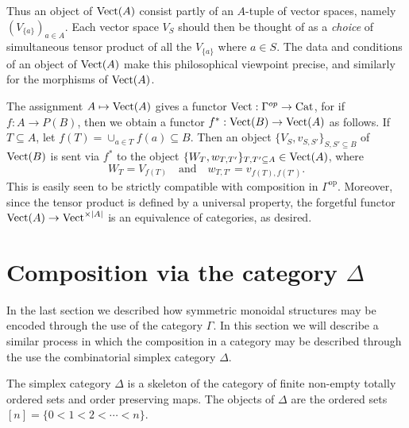 \documentclass{amsart}
\begin{document}
Thus an object of $\mathrm{Vect}(A)$ consist partly of an $A$-tuple of vector spaces, namely $ (V_{\{a\}})_{a \in A}$. Each vector space $V_S$ should then be thought of as a {\em choice} of simultaneous tensor product of all the $V_{\{a\}}$ where $a \in S$. The data and conditions of an object of $\mathrm{Vect}(A)$ make this philosophical viewpoint precise, and similarly for the morphisms of $\mathrm{Vect}(A)$. 

The assignment $A \mapsto \mathrm{Vect}(A)$ gives a functor $\mathrm{Vect}: \Gamma^{op} \to \mathrm{Cat}$, for if $f: A \to P(B)$, then we obtain a functor $f^*: \mathrm{Vect}(B) \to \mathrm{Vect}(A)$ as follows. If $T \subseteq A$, let $f(T) = \cup_{a \in T} f(a) \subseteq B$. Then an object $\{ V_S, v_{S,S'} \}_{S, S' \subseteq B}$ of $\mathrm{Vect}(B)$ is sent via $f^*$ to the object $\{ W_T, w_{T, T'} \}_{T, T' \subseteq A} \in \mathrm{Vect}(A)$, where 
\begin{equation*}
	W_T = V_{f(T)} \quad \textrm{and} \quad  w_{T, T'} = v_{f(T), f(T')}.
\end{equation*}
This is easily seen to be strictly compatible with composition in $\Gamma^\text{op}$. Moreover, since the tensor product is defined by a universal property, the forgetful functor $\mathrm{Vect}(A) \to \mathrm{Vect}^{\times |A|}$ is an equivalence of categories, as desired.  

\section{Composition via the category $\Delta$} \label{sec-Compdelta}



In the last section we described how symmetric monoidal structures may be encoded through the use of the category $\Gamma$. In this section we will describe a similar process in which the composition in a category may be described through the use the combinatorial simplex category $\Delta$. 

\begin{definition}
	The simplex category $\Delta$ is a skeleton of the category of finite non-empty totally ordered sets and order preserving maps. The objects of $\Delta$ are the ordered sets $[n] = \{ 0 < 1 < 2 < \cdots < n\}$. 
\end{definition}
\end{document}
